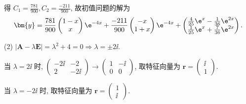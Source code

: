 \begin{solve}
  得 $C_1=\frac{781}{900},C_2=\frac{-211}{900}$, 故初值问题的解为
  \[\bm{y} = 
    \frac{781}{900}\begin{pmatrix}1-x\\x\end{pmatrix}\e^{-4x}
    + \frac{-211}{900}\begin{pmatrix}-x\\1+x\end{pmatrix}\e^{-4x}
    + \begin{pmatrix}
      \frac{4}{25}\e^x-\frac{1}{36}\e^{2x} \\
      \frac{1}{25}\e^x+\frac{7}{36}\e^{2x}
    \end{pmatrix}.\]

  (2) $|\bm{A}-\lambda\bm{E}|=\lambda^2+4=0\Rightarrow\lambda=\pm2\ii$.

  当 $\lambda=2\ii$ 时, $\begin{pmatrix}-2\ii&-2\\2&-2\ii\end{pmatrix}\to\begin{pmatrix}1&-\ii\\0&0\end{pmatrix}$, 
  取特征向量为 $\bm{r}=\begin{pmatrix}\ii\\1\end{pmatrix}$.

  当 $\lambda=-2\ii$ 时, 取特征向量为 $\bm{r}=\begin{pmatrix}1\\\ii\end{pmatrix}$.


\end{solve}
